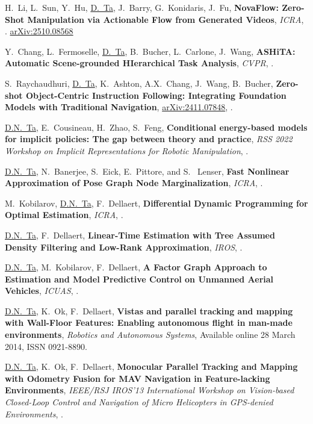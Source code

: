 \documentclass[letterpaper,MMMyyyy,nonstopmode]{simpleresumecv}
\begin{document}
\begin{Body}
\Gap
\NumberedItem{[22]}
{H.~Li, L.~Sun, Y.~Hu, \underline{D.~Ta}, J.~Barry, G.~Konidaris, J.~Fu,
\textbf{NovaFlow: Zero-Shot Manipulation via Actionable Flow from Generated Videos},
\textit{ICRA},
. \href{https://arxiv.org/abs/2510.08568}{arXiv:2510.08568}}

\Gap
\NumberedItem{[21]}
{Y.~Chang, L.~Fermoselle, \underline{D.~Ta}, B.~Bucher, L.~Carlone, J.~Wang,
\textbf{ASHiTA: Automatic Scene-grounded HIerarchical Task Analysis},
\textit{CVPR},
.}

\Gap
\NumberedItem{[20]}
{S.~Raychaudhuri, \underline{D.~Ta}, K.~Ashton, A.X.~Chang, J.~Wang, B.~Bucher,
\textbf{Zero-shot Object-Centric Instruction Following: Integrating Foundation Models with Traditional Navigation},
\href{https://arxiv.org/abs/2411.07848}{arXiv:2411.07848},
.}

\Gap
\NumberedItem{[19]}
{\underline{D.N.~Ta}, E.~Cousineau, H.~Zhao, S.~Feng,
\textbf{Conditional energy-based models for implicit policies: The gap between theory and practice},
\textit{RSS 2022 Workshop on Implicit Representations for Robotic Manipulation},
.}

\Gap
\NumberedItem{[18]}
{\underline{D.N.~Ta}, N.~Banerjee, S.~Eick, E.~Pittore, and S.~ Lenser,
\textbf{Fast Nonlinear Approximation of Pose Graph Node Marginalization},
\textit{ICRA},
.}

\Gap
\NumberedItem{[17]}
{M.~Kobilarov, \underline{D.N.~Ta}, F.~Dellaert,
\textbf{Differential Dynamic Programming for Optimal Estimation},
\textit{ICRA},
.}

\Gap
\NumberedItem{[16]}
{\underline{D.N.~Ta}, F.~Dellaert,
\textbf{Linear-Time Estimation with Tree Assumed Density Filtering and Low-Rank Approximation},
\textit{IROS},
.}

\Gap
\NumberedItem{[15]}
{\underline{D.N.~Ta}, M.~Kobilarov, F.~Dellaert,
\textbf{A Factor Graph Approach to Estimation and Model Predictive Control on Unmanned Aerial Vehicles},
\textit{ICUAS},
.}

\Gap
\NumberedItem{[14]}
{\underline{D.N.~Ta}, K.~Ok, F.~Dellaert,
\textbf{Vistas and parallel tracking and mapping with Wall-Floor Features: Enabling autonomous flight in man-made environments},
\textit{Robotics and Autonomous Systems},
Available online 28 March 2014, ISSN 0921-8890.}

\Gap
\NumberedItem{[13]}
{\underline{D.N.~Ta}, K.~Ok, F.~Dellaert,
\textbf{Monocular Parallel Tracking and Mapping with Odometry Fusion for MAV Navigation in Feature-lacking Environments},
\textit{IEEE/RSJ IROS'13 International Workshop on Vision-based Closed-Loop Control and Navigation of Micro Helicopters in GPS-denied Environments},
.}


\end{Body}
\end{document}
